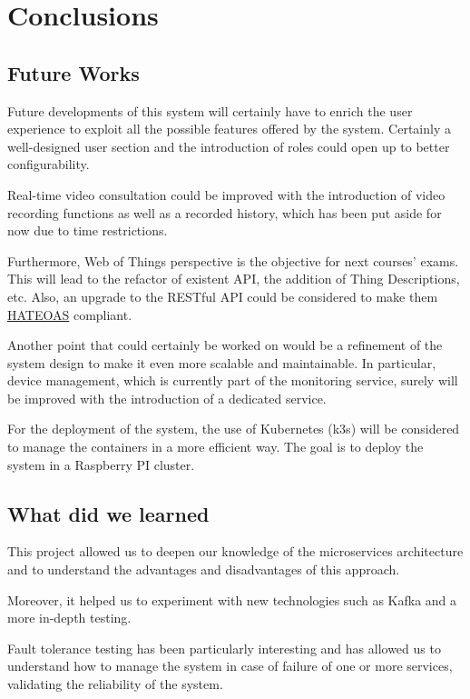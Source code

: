 \documentclass{scrartcl}
\begin{document}
    \section{Conclusions}

    \subsection{Future Works}

    Future developments of this system will certainly have to enrich the user experience to exploit all the possible features offered by the system.
    Certainly a well-designed user section and the introduction of roles could open up to better configurability.

    Real-time video consultation could be improved with the introduction of video recording functions as well as a recorded history,
    which has been put aside for now due to time restrictions.

    Furthermore, Web of Things perspective is the objective for next courses' exams.
    This will lead to the refactor of existent API, the addition of Thing Descriptions, etc.
    Also, an upgrade to the RESTful API could be considered to make them \href{https://en.wikipedia.org/wiki/HATEOAS}{HATEOAS} compliant.

    Another point that could certainly be worked on would be a refinement of the system design to make it even more scalable and maintainable.
    In particular, device management, which is currently part of the monitoring service, surely will be improved with the introduction of a dedicated service.

    For the deployment of the system, the use of Kubernetes (k3s) will be considered to manage the containers in a more efficient way.
    The goal is to deploy the system in a Raspberry PI cluster.

    \subsection{What did we learned}

    This project allowed us to deepen our knowledge of the microservices architecture and to understand the advantages and disadvantages of this approach.

    Moreover, it helped us to experiment with new technologies such as Kafka and a more in-depth testing.

    Fault tolerance testing has been particularly interesting and has allowed us to understand how to manage the system in case of failure of one or more services, validating the reliability of the system.
\end{document}
